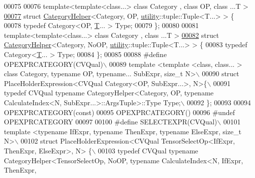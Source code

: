 \begin{DoxyCode}
00075 
00076 \textcolor{keyword}{template}<\textcolor{keyword}{template}<\textcolor{keyword}{class}...> \textcolor{keyword}{class }Category , \textcolor{keyword}{class }OP, \textcolor{keyword}{class }...T >
\hyperlink{struct_eigen_1_1_tensor_sycl_1_1internal_1_1_category_helper_3_01_category_00_01_o_p_00_01utilit485e974ddbafa51856a66c82ba2b607a}{00077} \textcolor{keyword}{struct }\hyperlink{struct_eigen_1_1_tensor_sycl_1_1internal_1_1_category_helper}{CategoryHelper}<Category, OP, \hyperlink{namespaceutility}{utility}::tuple::Tuple<T...> > \{
00078   \textcolor{keyword}{typedef} Category<OP, \hyperlink{group___sparse_core___module}{T}... > Type;
00079 \};
00080 
00081 \textcolor{keyword}{template}<\textcolor{keyword}{template}<\textcolor{keyword}{class}...> \textcolor{keyword}{class }Category , \textcolor{keyword}{class }...T >
\hyperlink{struct_eigen_1_1_tensor_sycl_1_1internal_1_1_category_helper_3_01_category_00_01_no_o_p_00_01utibb88c866c1595c08be9f6b8e0a368a00}{00082} \textcolor{keyword}{struct }\hyperlink{struct_eigen_1_1_tensor_sycl_1_1internal_1_1_category_helper}{CategoryHelper}<Category, NoOP, \hyperlink{namespaceutility}{utility}::tuple::Tuple<T...> > \{
00083   \textcolor{keyword}{typedef} Category<\hyperlink{group___sparse_core___module}{T}... > Type;
00084 \};
00085 
00088 \textcolor{preprocessor}{#define OPEXPRCATEGORY(CVQual)\(\backslash\)}
00089 \textcolor{preprocessor}{template <template <class, class... > class Category, typename OP, typename... SubExpr, size\_t N>\(\backslash\)}
00090 \textcolor{preprocessor}{struct PlaceHolderExpression<CVQual Category<OP, SubExpr...>, N>\{\(\backslash\)}
00091 \textcolor{preprocessor}{  typedef CVQual typename CategoryHelper<Category, OP, typename CalculateIndex<N,
       SubExpr...>::ArgsTuple>::Type Type;\(\backslash\)}
00092 \textcolor{preprocessor}{\};}
00093 
00094 OPEXPRCATEGORY(\textcolor{keyword}{const})
00095 OPEXPRCATEGORY()
00096 \textcolor{preprocessor}{#undef OPEXPRCATEGORY}
00097 
00100 \textcolor{preprocessor}{#define SELECTEXPR(CVQual)\(\backslash\)}
00101 \textcolor{preprocessor}{template <typename IfExpr, typename ThenExpr, typename ElseExpr, size\_t N>\(\backslash\)}
00102 \textcolor{preprocessor}{struct PlaceHolderExpression<CVQual TensorSelectOp<IfExpr, ThenExpr, ElseExpr>, N> \{\(\backslash\)}
00103 \textcolor{preprocessor}{  typedef CVQual typename CategoryHelper<TensorSelectOp, NoOP, typename CalculateIndex<N, IfExpr, ThenExpr,
}
\end{DoxyCode}
